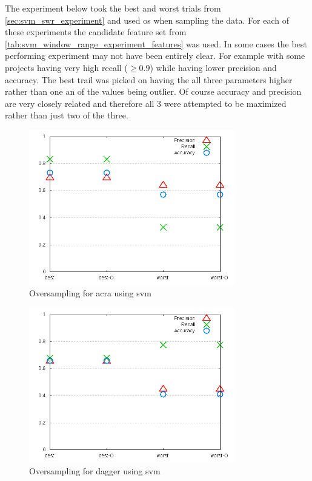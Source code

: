 The experiment below took the best and worst trials from \autoref{sec:svm_swr_experiment} and used \gls{os} when sampling the data. For each of these experiments the candidate feature set from \autoref{tab:svm_window_range_experiment_features} was used. In some cases the best performing experiment may not have been entirely clear. For example with some projects having very high recall ($ \geq 0.9$) while having lower precision and accuracy. The best trail was picked on having the all three parameters higher rather than one an of the values being outlier. Of course accuracy and precision are very closely related and therefore all 3 were attempted to be maximized rather than just two of the three.



\begin{figure}[!h]
    \centering

        \includegraphics[width=0.8\textwidth]{images/svm/test_4/acra_sample_range}
        \caption{Oversampling for acra using \gls{svm}}
        \label{fig:test_4_acra_svm}
\end{figure}

\begin{figure}[!h]
    \centering
        \includegraphics[width=0.8\textwidth]{images/svm/test_4/dagger_sample_range}
        \caption{Oversampling for dagger using \gls{svm}}
        \label{fig:test_4_dagger_svm}
\end{figure}

